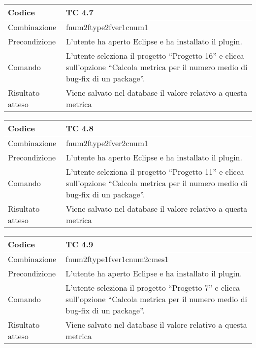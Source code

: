 \begin{table}[ht]
\begin{tabular}{|p{3cm}|p{9cm}|}
\hline
\cellcolor{lightgray}Codice				& TC 4.7								\\
\hline
\cellcolor{lightgray}Combinazione		& fnum2ftype2fver1cnum1							\\
\hline
\cellcolor{lightgray}Precondizione		& L'utente ha aperto Eclipse e ha installato il plugin.									\\
\hline
\cellcolor{lightgray}Comando			& L'utente seleziona il progetto ``Progetto 16''  e clicca sull'opzione ``Calcola metrica per il numero medio di bug-fix di un package''.	\\
\hline
\cellcolor{lightgray}Risultato atteso	& Viene salvato nel database il valore relativo a questa metrica	\\
\hline
\end{tabular}
\end{table}

\begin{table}[ht]
\begin{tabular}{|p{3cm}|p{9cm}|}
\hline
\cellcolor{lightgray}Codice				& TC 4.8								\\
\hline
\cellcolor{lightgray}Combinazione		& fnum2ftype2fver2cnum1 									\\
\hline
\cellcolor{lightgray}Precondizione		& L'utente ha aperto Eclipse e ha installato il plugin.				\\
\hline
\cellcolor{lightgray}Comando			& L'utente seleziona il progetto ``Progetto 11''  e clicca sull'opzione ``Calcola metrica per il numero medio di bug-fix di un package''.	\\
\hline
\cellcolor{lightgray}Risultato atteso	& Viene salvato nel database il valore relativo a questa metrica	\\
\hline
\end{tabular}
\end{table}

\begin{table}[ht]
\begin{tabular}{|p{3cm}|p{9cm}|}
\hline
\cellcolor{lightgray}Codice				& TC 4.9								\\
\hline
\cellcolor{lightgray}Combinazione		& fnum2ftype1fver1cnum2cmes1 									\\
\hline
\cellcolor{lightgray}Precondizione		& L'utente ha aperto Eclipse e ha installato il plugin.								\\
\hline
\cellcolor{lightgray}Comando			& L'utente seleziona il progetto ``Progetto 7''  e clicca sull'opzione ``Calcola metrica per il numero medio di bug-fix di un package''.	\\
\hline
\cellcolor{lightgray}Risultato atteso	& Viene salvato nel database il valore relativo a questa metrica	\\
\hline
\end{tabular}
\end{table}

